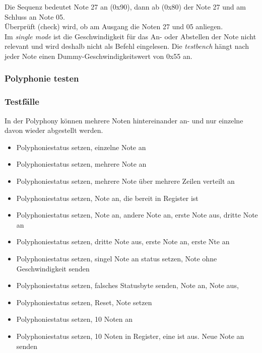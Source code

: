 Die Sequenz bedeutet Note 27 an (0x90), dann ab (0x80) der Note 27 und am Schluss an Note 05. \\
Überprüft (check) wird, ob am Ausgang die Noten 27 und 05 anliegen.\\
Im \textit{single mode} ist die Geschwindigkeit für das An- oder Abstellen der Note nicht relevant und wird deshalb nicht als Befehl eingelesen. Die \textit{testbench} hängt nach jeder Note einen Dummy-Geschwindigkeitswert von 0x55 an. \bigskip


\subsubsection{Polyphonie testen }\label{polyphonitest}

\subsubsection{Testfälle}
In der Polyphony können mehrere Noten hintereinander an- und nur einzelne davon wieder abgestellt werden. \\
\begin{itemize}
\item Polyphoniestatus setzen, einzelne Note an
\item Polyphoniestatus setzen, mehrere Note an
\item Polyphoniestatus setzen, mehrere Note über mehrere Zeilen verteilt an
\item Polyphoniestatus setzen, Note an, die bereit in Register ist
\item Polyphoniestatus setzen, Note an, andere Note an, erste Note aus, dritte Note an
\item Polyphoniestatus setzen, dritte Note aus, erste Note an, erste Nte an
\item Polyphoniestatus setzen, singel Note an status setzen, Note ohne Geschwindigkeit senden
\item Polyphoniestatus setzen, falsches Statusbyte senden, Note an, Note aus,
\item Polyphoniestatus setzen, Reset, Note setzen
\item Polyphoniestatus setzen, 10 Noten an
\item Polyphoniestatus setzen, 10 Noten in Register, eine ist aus. Neue Note an senden
\end{itemize}
\smallskip

